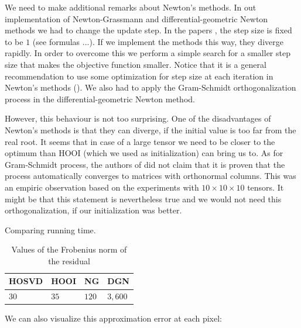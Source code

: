 We need to  make additional remarks about Newton's methods.
In out implementation of Newton-Grassmann and differential-geometric Newton
methods we had to change the update step. In the papers \cite{elden_savas_2007},
\cite{IDLAVH09} the step size is fixed to be $1$ (see formulas ...).
If we implement the methods this way, they diverge rapidly. In order to overcome
this we perform a simple search for a smaller step size that makes the objective
function smaller.
Notice that it is a general recommendation to use some optimization
for step size at each iteration in Newton's methods (\cite{num_recipes}).
We also had to apply the Gram-Schmidt 
orthogonalization process in the differential-geometric Newton method.


However, this behaviour is  not too surprising. One of the disadvantages
of Newton's methods is that they can diverge, if the initial value
is too far from the real root. It seems that in case of 
a large tensor we need to be closer to the optimum than HOOI (which we used
as initialization) can bring us to. As for Gram-Schmidt process,
the authors of \cite{IDLAVH09} did not claim that it is proven
that the process automatically converges to matrices with orthonormal 
columns. This was an empiric observation based on the experiments
with $10 \times 10 \times 10$ tensors. It might be that this statement
is  nevertheless true and we would not need this orthogonalization, if 
our initialization was better.



Comparing running time.

\begin{table}[h]
\centering
\begin{tabular}{|l|l|l|l|}
\hline
HOSVD & HOOI & NG & DGN \\ \hline
$30$  & $35$  & $120$ & $3,600$ \\ \hline
\end{tabular}
\caption{Values of the Frobenius norm of the residual}
\label{running_time_per_iteration}
\end{table}


We can also visualize this approximation error at each pixel:

